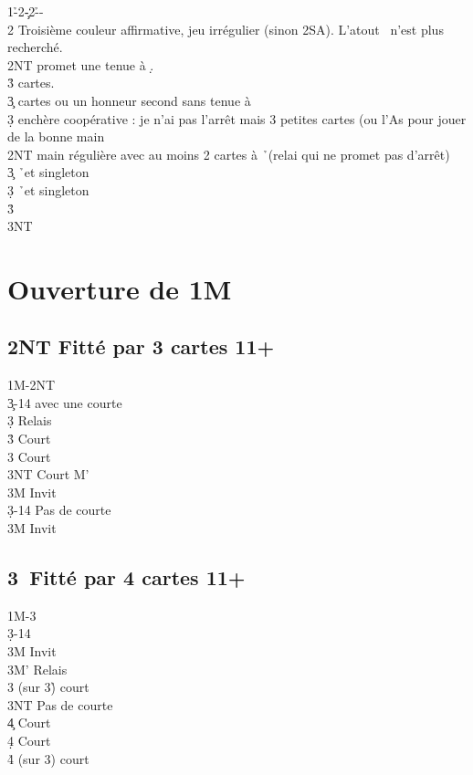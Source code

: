 \documentclass[a4paper]{article}
\begin{document}
\begin{bidtable}
1\h-2\c-2\h--\\
2\s \> Troisième couleur affirmative, jeu irrégulier (sinon 2SA). L’atout \s\ n’est plus recherché.\+\\
2NT \> promet une tenue à \d .\\
3\h {} cartes.\\
3\c {} cartes ou un honneur second sans tenue à \d \\
3\d \> enchère coopérative : je n’ai pas l’arrêt mais 3 petites cartes (ou l’As pour jouer de la bonne main\-\\
2NT \> main régulière avec au moins 2 cartes à \h\ (relai qui ne promet pas d'arrêt)\+\\
3\c {} \h\ et singleton \c \\
3\d {} \h\ et singleton \d \\
3\h {}\\
3NT \-
\end{bidtable}

\section{Ouverture de 1M}

\subsection{2NT Fitté par 3 cartes 11+}

\begin{bidtable}
1M-2NT\\
3\c {}-14 avec une courte\+\\
3\d \> Relais\+\\
3\h \> Court \c \\
3\s \> Court \d \\
3NT \> Court M'\-\\
3M \> Invit\-\\
3\d {}-14 Pas de courte\+\\
3M \> Invit\-
\end{bidtable}

\subsection{3\pdfc\ Fitté par 4 cartes 11+}

\begin{bidtable}
1M-3\c\\
3\d {}-14\+\\
3M \> Invit\\
3M' \> Relais\+\\
3\s \> (sur 3\h ) court \h \\
3NT \> Pas de courte\\
4\c \> Court \c \\
4\d \> Court \d \\
4\h \> (sur 3\s ) court \s \-\-
\end{bidtable}
\end{document}
